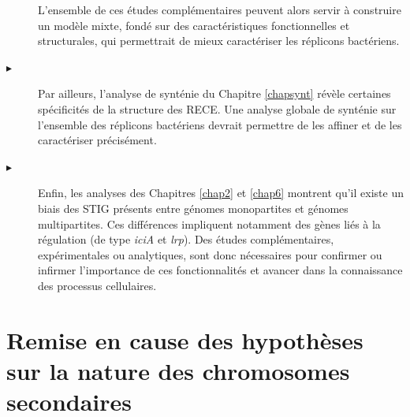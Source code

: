 \begin{description}
L'ensemble de ces études complémentaires peuvent alors servir à construire un modèle mixte, fondé sur des caractéristiques fonctionnelles et structurales, qui permettrait de mieux caractériser les réplicons bactériens. 
\item[$\blacktriangleright$] Par ailleurs, l'analyse de synténie du Chapitre \ref{chapsynt} révèle certaines spécificités de la structure des RECE. Une analyse globale de synténie sur l'ensemble des réplicons bactériens devrait permettre de les affiner et de les caractériser précisément. 
\item[$\blacktriangleright$] Enfin, les analyses des Chapitres \ref{chap2} et \ref{chap6} montrent qu'il existe un biais des STIG présents entre génomes monopartites et génomes multipartites. Ces différences impliquent notamment des gènes liés à la régulation (de type \textit{iciA} et \textit{lrp}). Des études complémentaires, expérimentales ou analytiques, sont donc nécessaires pour confirmer ou infirmer l'importance de ces fonctionnalités et avancer dans la connaissance des processus cellulaires.
\end{description}	
	


\section{Remise en cause des hypothèses sur la nature des chromosomes secondaires}\label{chromidefaux}
 
